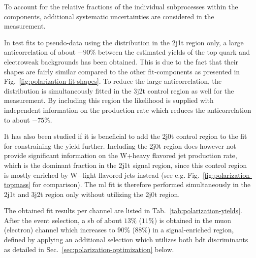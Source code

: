To account for the relative fractions of the individual subprocesses within the components, additional systematic uncertainties are considered in the measurement. 

In test fits to pseudo-data using the \bdttch distribution in the 2j1t region only, a large anticorrelation of about $-90\%$ between the estimated yields of the top quark and electroweak backgrounds has been obtained. This is due to the fact that their shapes are fairly similar compared to the other fit-components as presented in Fig.~\ref{fig:polarization-fit-shapes}. To reduce the large anticorrelation, the \bdttch distribution is simultaneously fitted in the 3j2t control region as well for the measurement. By including this region the likelihood is supplied with independent information on the \ttbar production rate which reduces the anticorrelation to about $-75\%$. 

It has also been studied if it is beneficial to add the 2j0t control region to the fit for constraining the \wjets yield further. Including the 2j0t region does however not provide significant information on the W+heavy flavored jet production rate, which is the dominant \wjets fraction in the 2j1t signal region, since this control region is mostly enriched by W+light flavored jets instead (see e.g. Fig.~\ref{fig:polarization-topmass} for comparison). The \gls{ml} fit is therefore performed simultaneously in the 2j1t and 3j2t region only without utilizing the 2j0t region.


The obtained fit results per channel are listed in Tab.~\ref{tab:polarization-yields}. After the event selection, a \gls{sb} of about $13\%$ ($11\%$) is obtained in the muon (electron) channel which increases to $90\%$ ($88\%$) in a signal-enriched region, defined by applying an additional selection which utilizes both \gls{bdt} discriminants as detailed in Sec.~\ref{sec:polarization-optimization} below.

